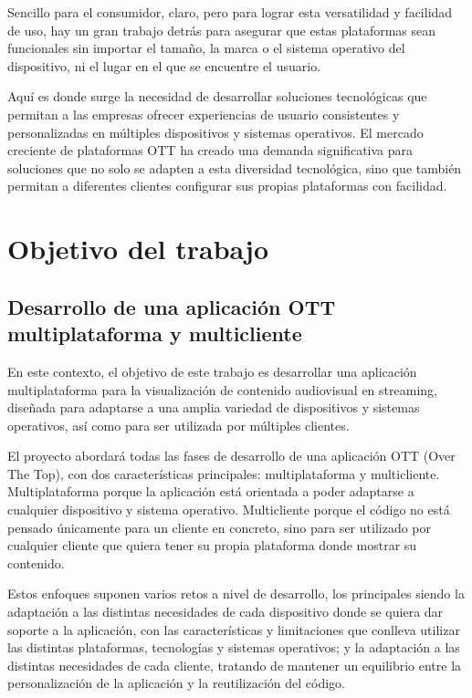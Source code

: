 Sencillo para el consumidor, claro, pero para lograr esta versatilidad y facilidad de uso, hay un gran trabajo detrás 
para asegurar que estas plataformas sean funcionales sin importar el tamaño, la marca o el sistema operativo del 
dispositivo, ni el lugar en el que se encuentre el usuario. 

Aquí es donde surge la necesidad de desarrollar soluciones tecnológicas que permitan a las empresas ofrecer experiencias 
de usuario consistentes y personalizadas en múltiples dispositivos y sistemas operativos. El mercado creciente de plataformas 
OTT ha creado una demanda significativa para soluciones que no solo se adapten a esta diversidad tecnológica, sino que 
también permitan a diferentes clientes configurar sus propias plataformas con facilidad.



\section{Objetivo del trabajo}
\label{sec:objetivo}
\subsection{Desarrollo de una aplicación OTT multiplataforma y multicliente}
\label{sec:PlataformaOTT_introduccion}

En este contexto, el objetivo de este trabajo es desarrollar una aplicación multiplataforma para la visualización de contenido 
audiovisual en streaming, diseñada para adaptarse a una amplia variedad de dispositivos y sistemas operativos, así como para 
ser utilizada por múltiples clientes. 

El proyecto abordará todas las fases de desarrollo de una aplicación OTT (Over The Top), con dos características principales: 
multiplataforma y multicliente. Multiplataforma porque la aplicación está orientada a poder adaptarse a cualquier dispositivo 
y sistema operativo. Multicliente porque el código no está pensado únicamente para un cliente en concreto, sino para ser 
utilizado por cualquier cliente que quiera tener su propia plataforma donde mostrar su contenido.

Estos enfoques suponen varios retos a nivel de desarrollo, los principales siendo la adaptación a las distintas necesidades de 
cada dispositivo donde se quiera dar soporte a la aplicación, con las características y limitaciones que conlleva utilizar las 
distintas plataformas, tecnologías y sistemas operativos; y la adaptación a las distintas necesidades de cada cliente, tratando 
de mantener un equilibrio entre la personalización de la aplicación y la reutilización del código.

